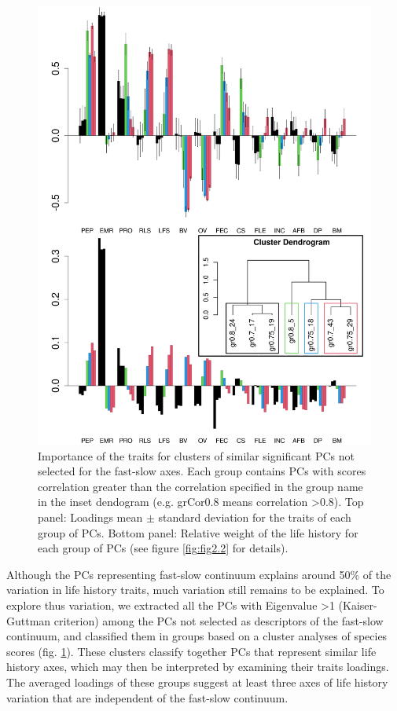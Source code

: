 \begin{figure}
\centering
\includegraphics[width=\textwidth]{./Figures/chapter02/fig3-Secondary axes.png}
\caption[Alternative axes groups and PC loadings]{
Importance of the traits for clusters of similar significant PCs not selected
for the fast-slow axes. Each group contains PCs with scores correlation greater
than the correlation specified in the group name in the inset dendogram (e.g.
grCor0.8 means correlation \textgreater{0.8}). Top panel: Loadings mean $\pm$
standard deviation for the traits of each group of PCs. Bottom panel: Relative
weight of the life history for each group of PCs (see figure \ref{fig:fig2.2}
for details).}
\label{fig:fig2.3}
\end{figure}

Although the PCs representing fast-slow continuum explains around 50\% of the 
variation in life history traits, much variation still remains to be explained.
To explore thus variation, we extracted all the PCs with Eigenvalue
\textgreater{1} (Kaiser-Guttman criterion) among the
PCs not selected as descriptors of the fast-slow continuum, and classified them
in groups based on a cluster analyses of species scores (fig. \ref{fig:fig2.3}).
These clusters classify together PCs that represent similar life history axes,
which may then be interpreted by examining their traits loadings. The averaged
loadings of these groups suggest at least three axes of life history variation
that are independent of the fast-slow continuum.

